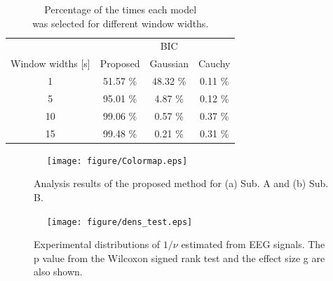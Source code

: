 \documentclass[journal]{IEEEtran}
\begin{document}
\begin{table}[t]
 \begin{center}
 \caption[Subject conditions]{Percentage of the times each model\\
 was selected for different window widths.}
 \label{table:BIC}
 \vspace{-2.5mm}
  \begin{tabular}{cccc}
   \toprule %
    & &{BIC} & \\
   {Window widths [s]} & {Proposed} &  Gaussian & Cauchy \\
   \midrule %
   1 & 51.57 \%  & 48.32 \%  & 0.11 \% \\ %
   5 & 95.01 \%  & 4.87 \%  & 0.12 \%  \\ %
   10 & 99.06 \%  & 0.57 \%  & 0.37 \%  \\ %
   15 & 99.48 \%  & 0.21 \%  & 0.31 \%  \\ %
   \bottomrule %
  \end{tabular}
 \end{center}
\end{table}

\begin{figure}[!t]　%
\centering
\texttt{[image: figure/Colormap.eps]}
\caption{Analysis results of the proposed method for (a) Sub. A and (b) Sub. B.}
\label{fig:Colormap}
\end{figure}

\begin{figure}[!t]　%
\centering
\texttt{[image: figure/dens\_test.eps]}
\caption{Experimental distributions of $1/\nu$ estimated from EEG signals. The p value from the Wilcoxon signed rank test and the effect size g are also shown. }
\label{fig:dens}
\end{figure}
\end{document}

